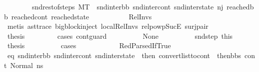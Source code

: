 \begin{isabellebody}
\ \ \ \ \ \ \ \ snd{\isacharunderscore}{\kern0pt}rest{\isacharunderscore}{\kern0pt}of{\isacharunderscore}{\kern0pt}steps{\isacharcolon}{\kern0pt}\ {\isachardoublequoteopen}M{\isacharcomma}{\kern0pt}{\isasymLambda}{\isacharcomma}{\kern0pt}{\isasymGamma}{\isacharcomma}{\kern0pt}{\isasymOmega}{\isacharcomma}{\kern0pt}T\ {\isasymturnstile}\ {\isacharparenleft}{\kern0pt}snd{\isacharunderscore}{\kern0pt}inter{\isacharunderscore}{\kern0pt}bb{\isacharcomma}{\kern0pt}\ snd{\isacharunderscore}{\kern0pt}inter{\isacharunderscore}{\kern0pt}cont{\isacharcomma}{\kern0pt}\ snd{\isacharunderscore}{\kern0pt}inter{\isacharunderscore}{\kern0pt}state{\isacharparenright}{\kern0pt}\ {\isacharminus}{\kern0pt}n{\isasymlongrightarrow}{\isacharcircum}{\kern0pt}j{\isacharprime}{\kern0pt}\ {\isacharparenleft}{\kern0pt}reached{\isacharunderscore}{\kern0pt}bb{\isacharcomma}{\kern0pt}\ reached{\isacharunderscore}{\kern0pt}cont{\isacharcomma}{\kern0pt}\ reached{\isacharunderscore}{\kern0pt}state{\isacharparenright}{\kern0pt}{\isachardoublequoteclose}\ \isanewline
\ \ \ \ \ \ \ \ \isamarkupfalse%
\ Rel{\isacharunderscore}{\kern0pt}Invs\isanewline
\ \ \ \ \ \ \ \ \isamarkupfalse%
\ {\isacharparenleft}{\kern0pt}metis\ ast{\isacharunderscore}{\kern0pt}trace\ bigblock{\isachardot}{\kern0pt}inject\ local{\isachardot}{\kern0pt}Rel{\isacharunderscore}{\kern0pt}Invs{\isacharparenleft}{\kern0pt}{}{\isacharparenright}{\kern0pt}\ relpowp{\isacharunderscore}{\kern0pt}Suc{\isacharunderscore}{\kern0pt}E{}\ surj{\isacharunderscore}{\kern0pt}pair{\isacharparenright}{\kern0pt}\isanewline
\isanewline
\ \ \ \ \ \ \isamarkupfalse%
\ {\isacharquery}{\kern0pt}thesis\ \isanewline
\ \ \ \ \ \ \isamarkupfalse%
\ {\isacharparenleft}{\kern0pt}cases\ cont{\isacharunderscore}{\kern0pt}guard{\isacharparenright}{\kern0pt}\isanewline
\ \ \ \ \ \ \ \ \isamarkupfalse%
\ None\isanewline
\ \ \ \ \ \ \ \ \isamarkupfalse%
\ snd{\isacharunderscore}{\kern0pt}step\ this\ \isamarkupfalse%
\ {\isacharquery}{\kern0pt}thesis\isanewline
\ \ \ \ \ \ \ \ \isamarkupfalse%
\ cases\isanewline
\ \ \ \ \ \ \ \ \ \ \isamarkupfalse%
\ RedParsedIfTrue\isanewline
\ \ \ \ \ \ \ \ \ \ \isamarkupfalse%
\ eq{\isacharcolon}{\kern0pt}\ {\isachardoublequoteopen}{\isacharparenleft}{\kern0pt}snd{\isacharunderscore}{\kern0pt}inter{\isacharunderscore}{\kern0pt}bb{\isacharcomma}{\kern0pt}\ snd{\isacharunderscore}{\kern0pt}inter{\isacharunderscore}{\kern0pt}cont{\isacharcomma}{\kern0pt}\ snd{\isacharunderscore}{\kern0pt}inter{\isacharunderscore}{\kern0pt}state{\isacharparenright}{\kern0pt}\ {\isacharequal}{\kern0pt}\ {\isacharparenleft}{\kern0pt}then{}{\isacharcomma}{\kern0pt}\ convert{\isacharunderscore}{\kern0pt}list{\isacharunderscore}{\kern0pt}to{\isacharunderscore}{\kern0pt}cont\ {\isacharparenleft}{\kern0pt}\ then{\isacharunderscore}{\kern0pt}bbs{\isacharparenright}{\kern0pt}\ cont{}{\isacharcomma}{\kern0pt}\ {\isacharparenleft}{\kern0pt}Normal\ ns{}{\isacharparenright}{\kern0pt}{\isacharparenright}{\kern0pt}{\isachardoublequoteclose}\ \isamarkupfalse%

\end{isabellebody}

